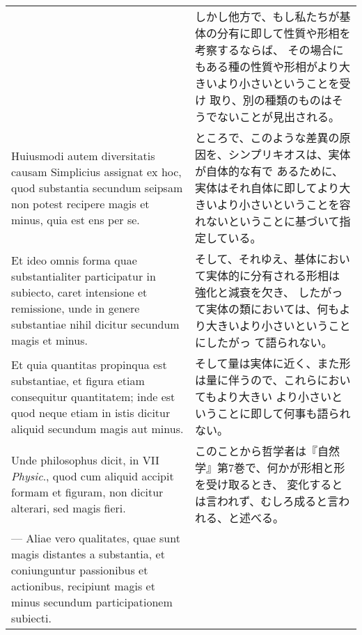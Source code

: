 \documentclass[10pt]{jsarticle} %
\begin{document}
\begin{longtable}{p{21em}p{21em}}
&

しかし他方で、もし私たちが基体の分有に即して性質や形相を考察するならば、
 その場合にもある種の性質や形相がより大きいより小さいということを受け
 取り、別の種類のものはそうでないことが見出される。

\\


Huiusmodi autem
diversitatis causam Simplicius assignat ex hoc, quod substantia
secundum seipsam non potest recipere magis et minus, quia est ens per
se. 


&

ところで、このような差異の原因を、シンプリキオスは、実体が自体的な有で
 あるために、実体はそれ自体に即してより大きいより小さいということを容
 れないということに基づいて指定している。

\\


Et ideo omnis forma quae substantialiter participatur in subiecto,
caret intensione et remissione, unde in genere substantiae nihil
dicitur secundum magis et minus. 


&

そして、それゆえ、基体において実体的に分有される形相は強化と減衰を欠き、
 したがって実体の類においては、何もより大きいより小さいということにしたがっ
 て語られない。

\\


Et quia quantitas propinqua est
substantiae, et figura etiam consequitur quantitatem; inde est quod
neque etiam in istis dicitur aliquid secundum magis aut minus. 


&

そして量は実体に近く、また形は量に伴うので、これらにおいてもより大きい
 より小さいということに即して何事も語られない。

\\


Unde
philosophus dicit, in VII {\itshape Physic}., quod cum aliquid accipit formam et
figuram, non dicitur alterari, sed magis fieri. 


&

このことから哲学者は『自然学』第7巻で、何かが形相と形を受け取るとき、
 変化するとは言われず、むしろ成ると言われる、と述べる。

\\


--- Aliae vero qualitates,
quae sunt magis distantes a substantia, et coniunguntur passionibus et
actionibus, recipiunt magis et minus secundum participationem
subiecti. 



\end{longtable}
\end{document}
